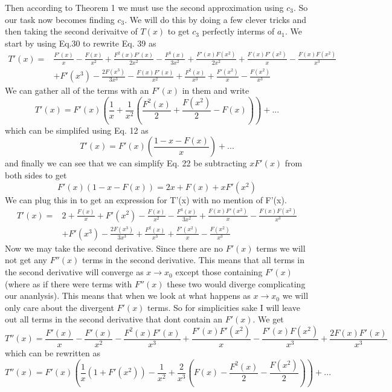 \documentclass{article}
\begin{document}
Then according to Theorem 1 we must use the second approximation using \(c_3\). So our task now becomes finding \(c_3\). We will do this by doing a few clever tricks and then taking the second derivaitve of \(T(x)\) to get \(c_3\) perfectly interms of \(a_1\). 
We start by using Eq.30 to rewrite Eq. 39 as 
\begin{align}
T'(x)=& \frac{F'(x)}{x}-\frac{F(x)}{x^2}+\frac{F^2(x)F'(x)}{2x^2}-\frac{F^3(x)}{3x^2}+\frac{F'(x)F(x^2)}{2x^2}+\frac{F(x)F'(x^2)}{x}-\frac{F(x)F(x^2)}{x^3}\nonumber \\
&+  F'(x^3)-\frac{2F(x^3)}{3x^3}-\frac{F(x)F'(x)}{x^2}+\frac{F^2(x)}{x^3}+\frac{F'(x^2)}{x}-\frac{F(x^2)}{x^3}
\end{align}
We can gather all of the terms with an \(F'(x)\) in them and write
\[T'(x)=F'(x)\left(\frac{1}{x}+\frac{1}{x^2}\left(\frac{F^2(x)}{2}+\frac{F(x^2)}{2}-F(x)\right)\right)+...\]
which can be simplifed using Eq. 12 as 
\[T'(x)=F'(x)\left(\frac{1-x-F(x)}{x}\right)+...\]
and finally we can see that we can simplify Eq. 22 be subtracting \(xF'(x)\) from both sides to get
\begin{equation}
F'(x)(1-x-F(x))=2x+F(x)+xF'(x^2)
\end{equation}
 We can plug this in to get an expression for T'(x) with no mention of F'(x).
\begin{align}
T'(x)= & 2+\frac{F(x)}{x}+F'(x^2)-\frac{F(x)}{x^2}-\frac{F^3(x)}{3x^2}+\frac{F(x)F'(x^2)}{x}-\frac{F(x)F(x^2)}{x^3}\nonumber \\
&+ F'(x^3)-\frac{2F(x^3)}{3x^3}+\frac{F^2(x)}{x^3}+\frac{F'(x^2)}{x}-\frac{F(x^2)}{x^3}
\end{align}
Now we may take the second derivative. Since there are no \(F'(x)\) terms we will not get any \(F''(x)\) terms in the second derivative. This means that all terms in the second derivative will converge as \(x \to x_0\) except those containing \(F'(x)\) (where as if there were terms with \(F''(x)\) these two would diverge complicating our ananlysis). This means that when we look at what happens as \(x \to x_0\) we will only care about the divergent \(F'(x)\) terms. So for simplicities sake I will leave out all terms in the second derivative that dont contain an \(F'(x)\). We get
\begin{equation}
T''(x)=\frac{F'(x)}{x}-\frac{F'(x)}{x^2}-\frac{F^2(x)F'(x)}{x^3}+\frac{F'(x)F'(x^2)}{x}-\frac{F'(x)F(x^2)}{x^3}+\frac{2F(x)F'(x)}{x^3}
\end{equation}
which can be rewritten as 
\begin{equation}
T''(x)=F'(x)\left(\frac{1}{x}(1+F'(x^2))-\frac{1}{x^2}+\frac{2}{x^3}\left(F(x)-\frac{F^2(x)}{2}-\frac{F(x^2)}{2}\right)\right)+...
\end{equation}
\end{document}
